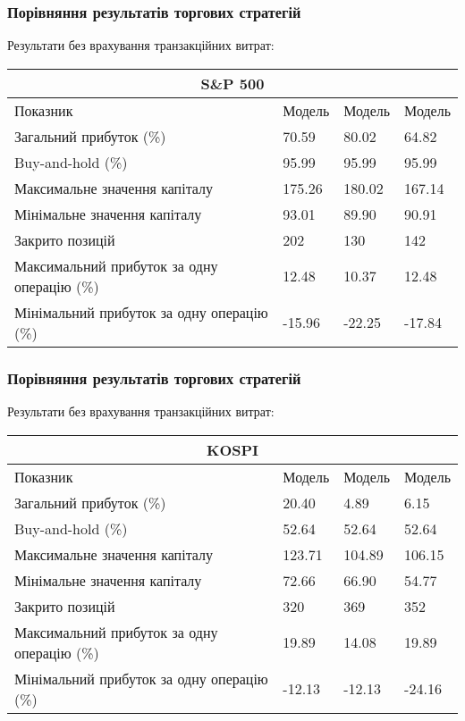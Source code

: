\documentclass[aspectratio=169]{beamer}
\begin{document}
	\begin{frame}
		\frametitle{Порівняння результатів торгових стратегій}
		Результати без врахування транзакційних витрат:\\
		\bigskip
		\begin{tabular}{ |p{7.8cm}||p{1.6cm}|p{1.6cm}|p{1.6cm}|  }
			\hline
			\multicolumn{4}{|c|}{S\&P 500} \\
			\hline
			Показник& Модель #1 &Модель #2&Модель #3\\
			\hline
			Загальний прибуток (\%)	&\cellcolor{pink!25}70.59&	\cellcolor{pink!25}80.02	&\cellcolor{pink!25}64.82\\
			Buy-and-hold (\%) & \cellcolor{blue!8}95.99 & \cellcolor{blue!8}95.99 & \cellcolor{blue!8}95.99 \\
			Максимальне значення капіталу &	175.26&	180.02	&167.14\\
			Мінімальне значення капіталу&	93.01	&89.90	&90.91\\
			Закрито позицій&	202&	130&	142\\
			Максимальний прибуток за одну операцію (\%)&	12.48&	10.37&	12.48\\
			Мінімальний прибуток за одну операцію (\%)&	-15.96&	-22.25&	-17.84\\
			\hline
		\end{tabular}
	\end{frame}
	
	\begin{frame}
		\frametitle{Порівняння результатів торгових стратегій}
		Результати без врахування транзакційних витрат:\\
		\bigskip
		\begin{tabular}{ |p{7.8cm}||p{1.6cm}|p{1.6cm}|p{1.6cm}|  }
			\hline
			\multicolumn{4}{|c|}{KOSPI} \\
			\hline
			Показник& Модель #1 &Модель #2&Модель #3\\
			\hline
			Загальний прибуток (\%)&\cellcolor{pink!25}20.40&	\cellcolor{pink!25}4.89&	\cellcolor{pink!25}6.15\\
			Buy-and-hold (\%) & \cellcolor{blue!8}52.64 &\cellcolor{blue!8}52.64& \cellcolor{blue!8}52.64\\
			Максимальне значення капіталу &123.71&	104.89&	106.15	\\
			Мінімальне значення капіталу&	72.66&	66.90&	54.77\\
			Закрито позицій&	320&	369	&352\\
			Максимальний прибуток за одну операцію (\%)&19.89&	14.08&	19.89	\\
			Мінімальний прибуток за одну операцію (\%)&	-12.13&	-12.13&	-24.16\\
			\hline
		\end{tabular}
	\end{frame}
	
\end{document}
